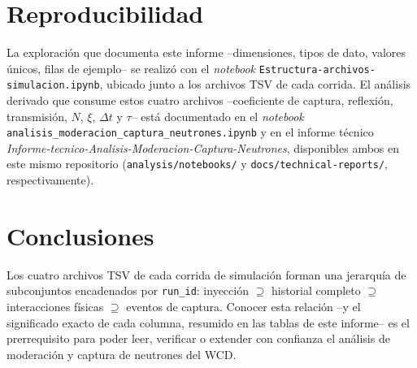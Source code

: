 \documentclass[11pt,a4paper]{article}
\newcommand{\codigo}[1]{\nolinkurl{#1}}
\newcommand{\archivo}[1]{\texttt{#1}} %
\newcommand{\var}[1]{\texttt{#1}}
\begin{document}
\section{Reproducibilidad}

La exploración que documenta este informe --dimensiones, tipos de dato, valores únicos, filas de
ejemplo-- se realizó con el \textit{notebook} \codigo{Estructura-archivos-simulacion.ipynb}, ubicado
junto a los archivos TSV de cada corrida. El análisis derivado que consume estos cuatro archivos
--coeficiente de captura, reflexión, transmisión, $N$, $\xi$, $\Delta t$ y $\tau$-- está documentado
en el \textit{notebook} \codigo{analisis\_moderacion\_captura\_neutrones.ipynb} y en el informe
técnico \textit{Informe-tecnico-Analisis-Moderacion-Captura-Neutrones}, disponibles ambos en este
mismo repositorio (\archivo{analysis/notebooks/} y \archivo{docs/technical-reports/},
respectivamente).

\section{Conclusiones}

Los cuatro archivos TSV de cada corrida de simulación forman una jerarquía de subconjuntos
encadenados por \var{run\_id}: inyección $\supseteq$ historial completo $\supseteq$ interacciones
físicas $\supseteq$ eventos de captura. Conocer esta relación --y el significado exacto de cada
columna, resumido en las tablas de este informe-- es el prerrequisito para poder leer, verificar o
extender con confianza el análisis de moderación y captura de neutrones del WCD.
\end{document}
